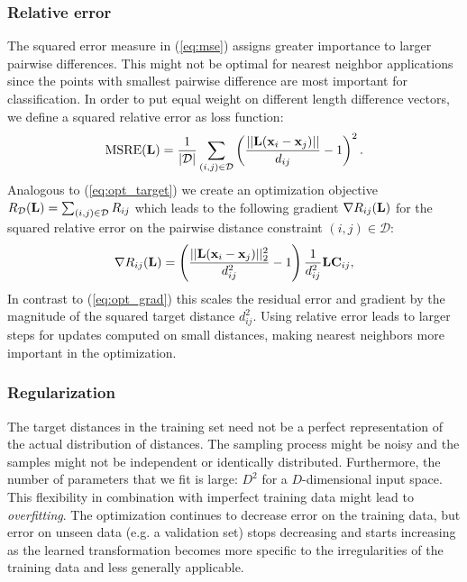 \subsubsection{Relative error}

The squared error measure in (\ref{eq:mse}) assigns greater importance to larger pairwise differences. This might not be optimal for nearest neighbor applications since the points with smallest pairwise difference are most important for classification.  In order to put equal weight on different length difference vectors, we define a squared relative error as loss function:
\begin{equation}
\text{MSRE}(\mathbf{L}) = \frac{1}{|\mathcal{D}|}\sum_{(i,j) \in \mathcal{D}} \left ( \frac{||\mathbf{L} (\mathbf{x}_i - \mathbf{x}_j)||}{d_{ij}} - 1 \right)^2.
\label{eq:msre}
\end{equation}
Analogous to (\ref{eq:opt_target}) we create an optimization objective $R_{\mathcal{D}}(\mathbf{L}) = \sum_{(i,j) \in \mathcal{D}} R_{ij}$ which leads to the following gradient $\nabla R_{ij}(\mathbf{L})$ for the squared relative error on the pairwise distance constraint $(i,j) \in \mathcal{D}$:
\begin{equation}
\nabla R_{ij}(\mathbf{L})  =  \left ( \frac{||\mathbf{L}(\mathbf{x}_i - \mathbf{x}_j)||_2^2}{d_{ij}^2} - 1 \right) \frac{1}{d_{ij}^2} \mathbf{L} \mathbf{C}_{ij},
\label{eq:relative_grad}
\end{equation}
In contrast to (\ref{eq:opt_grad}) this scales the residual error and gradient by the magnitude of the squared target distance $d_{ij}^2$. Using relative error leads to larger steps for updates computed on small distances, making nearest neighbors more important in the optimization.


\subsubsection{Regularization}

The target distances in the training set need not be a perfect representation of the actual distribution of distances. The sampling process might be noisy and the samples might not be independent or identically distributed. Furthermore, the number of parameters that we fit is large: $D^2$ for a $D$-dimensional input space. This flexibility in combination with imperfect training data might lead to \emph{overfitting}. The optimization continues to decrease error on the training data, but error on unseen data (e.g. a validation set) stops decreasing and starts increasing as the learned transformation becomes more specific to the irregularities of the training data and less generally applicable.

